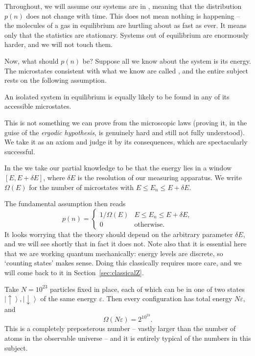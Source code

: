 \documentclass[a4paper]{scrartcl}
\newcommand{\ket}[1]{\left| #1 \right\rangle}
\begin{document}
Throughout, we will assume our systems are in , meaning that the distribution $p(n)$ does not change with time. This does not mean nothing is happening -- the molecules of a gas in equilibrium are hurtling about as fast as ever. It means only that the statistics are stationary. Systems out of equilibrium are enormously harder, and we will not touch them.

Now, what should $p(n)$ be? Suppose all we know about the system is its energy. The microstates consistent with what we know are called , and the entire subject rests on the following assumption.

\begin{axiom}
	An isolated system in equilibrium is equally likely to be found in any of its accessible microstates.
\end{axiom}

This is not something we can prove from the microscopic laws (proving it, in the guise of the \emph{ergodic hypothesis}, is genuinely hard and still not fully understood). We take it as an axiom and judge it by its consequences, which are spectacularly successful.

\begin{definition}
	In the  we take our partial knowledge to be that the energy lies in a window $[E, E + \delta E]$, where $\delta E$ is the resolution of our measuring apparatus. We write $\Omega(E)$ for the number of microstates with $E \leq E_n \leq E + \delta E$.
\end{definition}

The fundamental assumption then reads
$$
p(n) = \begin{cases}
	1/\Omega(E) & E \leq E_n \leq E + \delta E,\\
	0 & \text{otherwise.}
\end{cases}
$$
It looks worrying that the theory should depend on the arbitrary parameter $\delta E$, and we will see shortly that in fact it does not. Note also that it is essential here that we are working quantum mechanically: energy levels are discrete, so `counting states' makes sense. Doing this classically requires more care, and we will come back to it in Section~\ref{sec:classicalZ}.

\begin{example}
	Take $N = 10^{23}$ particles fixed in place, each of which can be in one of two states $\ket\uparrow, \ket\downarrow$ of the same energy $\varepsilon$. Then every configuration has total energy $N \varepsilon$, and
	$$
	\Omega(N\varepsilon) = 2^{10^{23}}.
	$$
	This is a completely preposterous number -- vastly larger than the number of atoms in the observable universe -- and it is entirely typical of the numbers in this subject.
\end{example}
\end{document}
